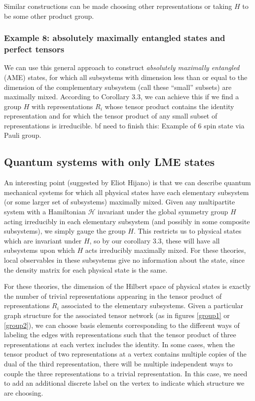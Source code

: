 \documentclass[12pt]{article}
\theoremstyle{definition}
\begin{document}
Similar constructions can be made choosing other representations or taking $H$ to be some other product group.

\subsubsection*{Example 8: absolutely maximally entangled states and perfect tensors}

We can use this general approach to construct {\it absolutely
maximally entangled} (AME) states, for which all subsystems with
dimension less than or equal to the dimension of the complementary
subsystem (call these ``small'' subsets) are maximally
mixed. According to Corollary 3.3, we can achieve this if we find a
group $H$ with representations $R_i$ whose tensor product contains the
identity representation and for which the tensor product of any small
subset of representations is irreducible. {bf need to finish this:
Example of 6 spin state via Pauli group}.

\subsection{Quantum systems with only LME states}

An interesting point (suggested by Eliot Hijano) is that we can describe quantum mechanical systems for which all physical states have each elementary subsystem (or some larger set of subsystems) maximally mixed. Given any multipartite system with a Hamiltonian ${\mathcal H}$ invariant under the global symmetry group $H$ acting irreducibly in each elementary subsystem (and possibly in some composite subsystems), we simply gauge the group $H$. This restricts us to physical states which are invariant under $H$, so by our corollary 3.3, these will have all subsystems upon which $H$ acts irreducibly maximally mixed. For these theories, local observables in these subsystems give no information about the state, since the density matrix for each physical state is the same.

For these theories, the dimension of the Hilbert space of physical states is exactly the number of trivial representations appearing in the tensor product of representations $R_i$ associated to the elementary subsystems. Given a particular graph structure for the associated tensor network (as in figures \ref{group1} or \ref{group2}), we can choose basis elements corresponding to the different ways of labeling the edges with representations such that the tensor product of three representations at each vertex includes the identity. In some cases, when the tensor product of two representations at a vertex contains multiple copies of the dual of the third representation, there will be multiple independent ways to couple the three representations to a trivial representation. In this case, we need to add an additional discrete label on the vertex to indicate which structure we are choosing.
\end{document}
